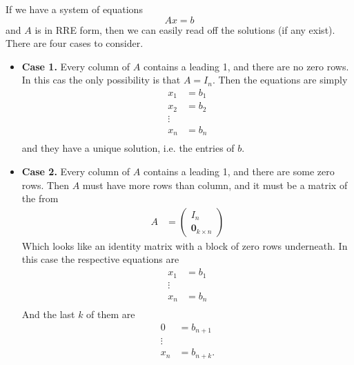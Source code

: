 \documentclass[11pt,a4paper]{article}
\theoremstyle{definition}
\begin{document}
If we have a system of equations 
\[ Ax = b\]
and $ A $ is in RRE form, then we can easily read off the solutions (if any exist). There are four cases to consider.
\begin{itemize}
    \item \textbf{Case 1.} Every column of $A$ contains a leading 1, and there are no zero rows. In this cas the only possibility is that $ A = I_n $.
    Then the equations are simply
    \begin{equation}
        \begin{split}
            x_1 &= b_1 \\
            x_2 &= b_2 \\
            \vdots & \\
            x_n &= b_n \\
        \end{split}
    \end{equation}
    and they have a unique solution, i.e. the entries of $b$.
    \item \textbf{Case 2.} Every column of $A$ contains a leading 1, and there are some zero rows. Then $A$ must have more rows than column, and it must be a matrix of the from
    \begin{align}
        A &= \begin{pmatrix}
            I_n \\
            \mathbf{0}_{k \times n}
        \end{pmatrix}
    \end{align}
    Which looks like an identity matrix with a block of zero rows underneath. In this case the respective equations are 
    \begin{equation}
        \begin{split}
            x_1 &= b_1 \\
            \vdots & \\
            x_n &= b_n \\
        \end{split}
    \end{equation}
    And the last $k$ of them are
    \begin{equation}
        \begin{split}
            0 &= b_{n+1} \\
            \vdots & \\
            x_n &= b_{n + k}. \\
        \end{split}
    \end{equation}

\end{itemize}
\end{document}
